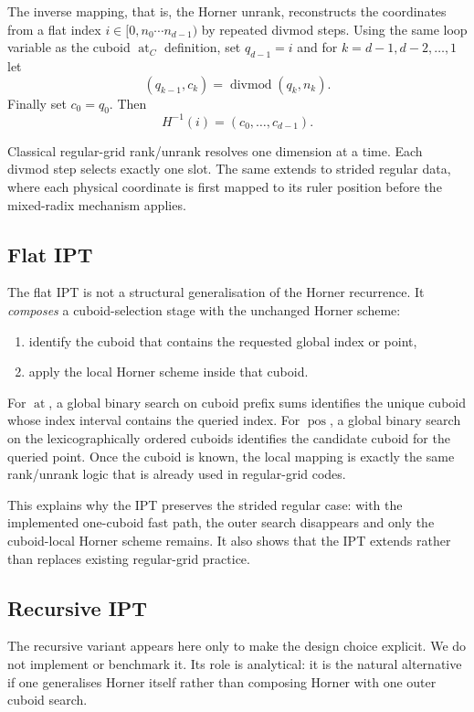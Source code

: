 \documentclass[manuscript,screen,review]{acmart}
\theoremstyle{definition}
\theoremstyle{plain}
\begin{document}
The inverse mapping, that is, the Horner unrank, reconstructs the coordinates from a flat index $i \in [0,n_0 \cdots n_{d-1})$ by repeated divmod steps. Using the same loop variable as the cuboid $\operatorname{at}_C$ definition, set $q_{d-1} = i$ and for $k=d{-}1,d{-}2,\dots,1$ let
\[
  (q_{k-1}, c_k) = \operatorname{divmod}(q_k, n_k).
\]
Finally set $c_0 = q_0$.
Then
\[
  H^{-1}(i) = (c_0,\dots,c_{d-1}).
\]

Classical regular-grid rank/unrank resolves one dimension at a
time. Each divmod step selects exactly one slot. The same extends to
strided regular data, where each physical coordinate is first mapped to its ruler position before the mixed-radix mechanism applies.

\subsection{Flat IPT}

The flat IPT is not a structural generalisation of the Horner recurrence. It \emph{composes}
a cuboid-selection stage with the unchanged Horner scheme:
\begin{enumerate}[leftmargin=*]
  \item identify the cuboid that contains the requested global index or point,
  \item apply the local Horner scheme inside that cuboid.
\end{enumerate}

For $\operatorname{at}$, a global binary search on cuboid prefix sums identifies the unique cuboid whose index interval contains the queried index. For $\operatorname{pos}$, a global binary search on the lexicographically ordered cuboids identifies the candidate cuboid for the queried point. Once the cuboid is known, the local mapping is exactly the same rank/unrank logic that is already used in regular-grid codes.

This explains why the IPT preserves the strided regular case: with the implemented one-cuboid fast path, the outer search disappears and only the cuboid-local Horner scheme remains. It also shows that the IPT extends rather than replaces existing regular-grid practice.

\subsection{Recursive IPT}

The recursive variant appears here only to make the design choice
explicit. We do not implement or benchmark it. Its role is analytical:
it is the natural alternative if one generalises Horner itself rather
than composing Horner with one outer cuboid search.
\end{document}

